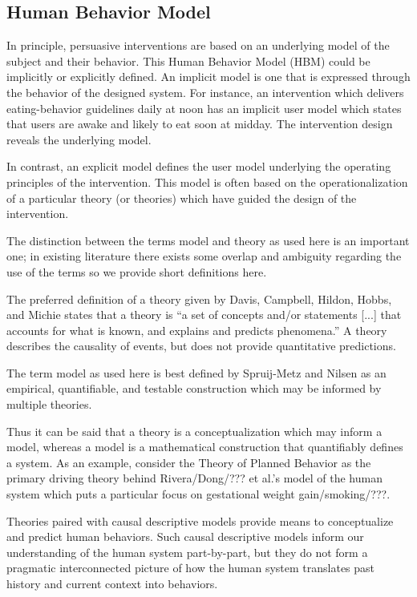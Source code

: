 \documentclass[runningheads,a4paper]{llncs}
\begin{document}
\subsection{Human Behavior Model}
In principle, persuasive interventions are based on an underlying  model of the subject and their behavior. 
This Human Behavior Model (HBM) could be implicitly or explicitly defined.
An implicit model is one that is expressed through the behavior of the designed system. 
For instance, an intervention which delivers eating-behavior guidelines daily at noon has an implicit user model which states that users are awake and likely to eat soon at midday.
The intervention design reveals the underlying model.

In contrast, an explicit model  defines the user model underlying the operating principles of the intervention. This model is often based on the operationalization of a particular theory (or theories) which have guided the design of the intervention.

The distinction between the terms model and theory as used here is an important one; in existing literature there exists some overlap and ambiguity regarding the use of the terms so we provide short definitions here.

The preferred definition of a theory given by Davis, Campbell, Hildon, Hobbs, and Michie \cite{davis2014} states that a theory is “a set of concepts and/or statements [...] that accounts for what is known, and explains and predicts phenomena.”
A theory describes the causality of events, but does not provide quantitative predictions.

The term model as used here is best defined by Spruij-Metz and Nilsen \cite{spruijtmetz2014} as an empirical, quantifiable, and testable construction which may be informed by multiple theories.

Thus it can be said that a theory is a conceptualization which may inform a model, whereas a model is a mathematical construction that quantifiably defines a system.
As an example, consider the Theory of Planned Behavior \cite{Bandura???} as the primary driving theory behind Rivera/Dong/??? \cite{???} et al.’s model of the human system which puts a particular focus on gestational weight gain/smoking/???.

Theories paired with causal descriptive models provide means to conceptualize and predict human behaviors.
Such causal descriptive models inform our understanding of the human system part-by-part, but they do not form a pragmatic interconnected picture of how the human system translates past history and current context into behaviors.  
\end{document}
